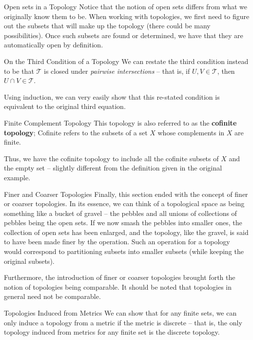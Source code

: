 \begin{remarkBox}{Open sets in a Topology}
    Notice that the notion of open sets differs from what we originally know 
    them to be. 
    When working with topologies, we first need to figure out the subsets that 
    will make up the topology (there could be many possibilities).
    Once such subsets are found or determined, we have that they are 
    automatically open by definition. 
\end{remarkBox}

\begin{remarkBox}{On the Third Condition of a Topology}
    We can restate the third condition instead to be that \( \mathcal{T} \) is 
    closed under \textit{pairwise intersections} -- that is, if 
    \( U, V \in \mathcal{T} \), then \( U \cap V \in \mathcal{T} \). 
    
    \baseSkip

    Using induction, we can very easily show that this re-stated condition is 
    equivalent to the original third equation. 
\end{remarkBox}

\begin{remarkBox}{Finite Complement Topology}
    This topology is also referred to as the \textbf{cofinite topology};
    Cofinite refers to the subsets of a set \( X \) whose complements in \( X \)
    are finite. 

    \baseSkip

    Thus, we have the cofinite topology to include all the cofinite subsets of 
    \( X \) and the empty set -- slightly different from the definition given 
    in the original example. 
\end{remarkBox}

\begin{remarkBox}{Finer and Coarser Topologies}
    Finally, this section ended with the concept of finer or coarser 
    topologies. 
    In its essence, we can think of a topological space as being something like 
    a bucket of gravel -- the pebbles and all unions of collections of pebbles 
    being the open sets.
    If we now smash the pebbles into smaller ones, the collection of open sets 
    has been enlarged, and the topology, like the gravel, is said to have been 
    made finer by the operation. 
    Such an operation for a topology would correspond to partitioning subsets
    into smaller subsets (while keeping the original subsets). 
    
    \baseSkip 

    Furthermore, the introduction of finer or coarser topologies brought
    forth the notion of topologies being comparable. It should be noted that topologies in general need not be comparable.
\end{remarkBox}

\begin{remarkBox}{Topologies Induced from Metrics}
    We can show that for any finite sets, we can only induce a topology from a 
    metric if the metric is discrete -- that is, the only topology induced from 
    metrics for any finite set is the discrete topology.
\end{remarkBox}